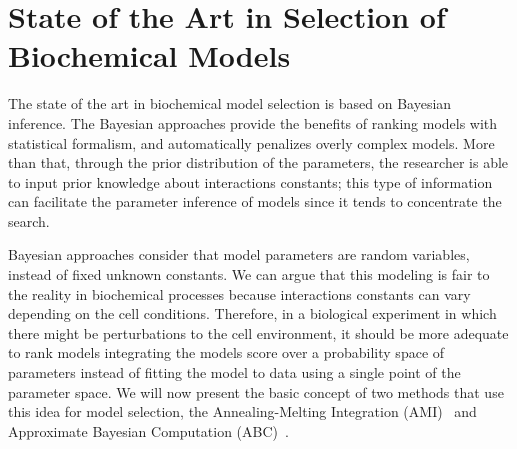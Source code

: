 \section{State of the Art in Selection of Biochemical Models}
The state of the art in biochemical model selection is based on Bayesian
inference. The Bayesian approaches provide the benefits of ranking 
models with statistical formalism, and automatically penalizes overly 
complex models. More than that, through the prior distribution of the
parameters, the researcher is able to input prior knowledge about 
interactions constants; this type of information can facilitate the 
parameter inference of models since it tends to concentrate the search.

Bayesian approaches consider that model parameters are random variables, 
instead of fixed unknown constants. We can argue that this modeling is 
fair to the reality in biochemical processes because interactions 
constants can vary depending on the cell conditions. Therefore, in a 
biological experiment in which there might be perturbations to the cell 
environment, it should be more adequate to rank models integrating the 
models score over a probability space of parameters instead of fitting 
the model to data using a single point of the parameter space. We will 
now present the basic concept of two methods that use this idea for 
model selection, the Annealing-Melting Integration 
(AMI)~\cite{Vyshemirsky2007} and Approximate Bayesian Computation 
(ABC)~\cite{Toni2009}.

